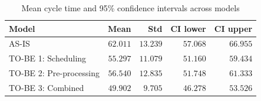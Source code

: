 \begin{table}[h]
\centering
\begin{threeparttable}
\begin{tabular}{lrrrr}
\toprule
\textbf{Model} & \textbf{Mean} & \textbf{Std} & \textbf{CI lower} & \textbf{CI upper} \\
\midrule
AS-IS                   & $62.011$ & $13.239$ & $57.068$ & $66.955$ \\
TO-BE 1: Scheduling     & $55.297$ & $11.079$ & $51.160$ & $59.434$ \\
TO-BE 2: Pre-processing & $56.540$ & $12.835$ & $51.748$ & $61.333$ \\
TO-BE 3: Combined       & $49.902$ &  $9.705$ & $46.278$ & $53.526$ \\
\bottomrule
\end{tabular}
\begin{tablenotes}
\small
\item 
\end{tablenotes}
\end{threeparttable}
\caption{Mean cycle time and 95\% confidence intervals across models}
\label{tab:ci}
\end{table}